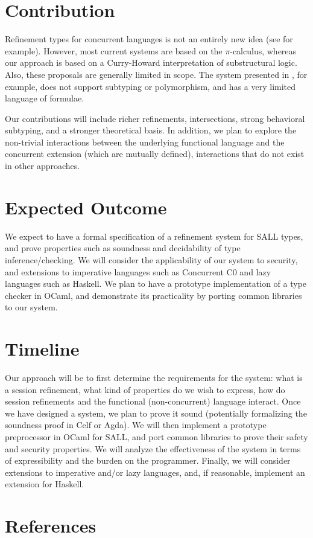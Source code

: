 \documentclass[11pt,twoside]{article}
\begin{document}
\section{Contribution}

Refinement types for concurrent languages is not an entirely new idea (see \cite{Franco14, Gordon09} for example). However, most current systems are based on the $\pi$-calculus, whereas our approach is based on a Curry-Howard interpretation of substructural logic. Also, these proposals are generally limited in scope. The system presented in \cite{Franco14}, for example, does not support subtyping or polymorphism, and has a very limited  language of formulae.

Our contributions will include richer refinements, intersections, strong behavioral
subtyping, and a stronger theoretical basis. In addition, we plan to explore the non-trivial interactions between the underlying functional language and the concurrent extension (which are mutually defined), interactions that do not exist in other approaches.

\section{Expected Outcome}

We expect to have a formal specification of a refinement system for SALL types, and prove properties such as soundness and decidability of type inference/checking. We will consider the applicability of our system to security, and extensions to imperative languages such as Concurrent C0 and lazy languages such as Haskell. We plan to have a prototype implementation of a type checker in OCaml, and demonstrate its practicality by porting common libraries to our system.

\section{Timeline}

Our approach will be to first determine the requirements for the system: what is a session refinement, what kind of properties do we wish to express, how do session refinements and the functional (non-concurrent) language interact. Once we have designed a system, we plan to prove it sound (potentially formalizing the soundness proof in Celf or Agda). We will then implement a prototype preprocessor in OCaml for SALL, and port common libraries to prove their safety and security properties. We will analyze the effectiveness of the system in terms of expressibility and the burden on the programmer. Finally, we will consider extensions to imperative and/or lazy languages, and, if reasonable, implement  an extension for Haskell.

\clearpage
\section{References}



\end{document}
